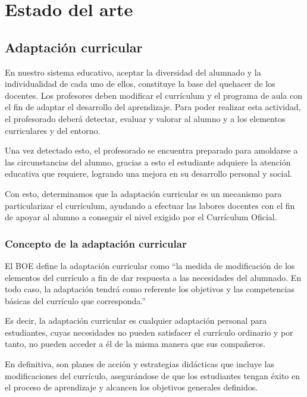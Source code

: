 \chapter{Estado del arte}
\label{cap:estadoDelArte}

\section{Adaptación curricular}
\nocite{adaptacionCurricular}
\nocite{adaptacionCurricular2}
En nuestro sistema educativo, aceptar la diversidad del alumnado y la individualidad de cada uno de ellos, constituye la base del quehacer de los docentes. Los profesores deben modificar el currículum y el programa de aula con el fin de adaptar el desarrollo del aprendizaje. Para poder realizar esta actividad, el profesorado deberá detectar, evaluar y valorar al alumno y a los elementos curriculares y del entorno.

Una vez detectado esto, el profesorado se encuentra preparado para amoldarse a las circunstancias del alumno, gracias a esto el estudiante adquiere la atención educativa que requiere, logrando una mejora en su desarrollo personal y social.

Con esto, determinamos que la adaptación curricular es un mecanismo para particularizar el currículum, ayudando a efectuar las labores docentes con el fin de apoyar al alumno a conseguir el nivel exigido por el Currículum Oficial. \nocite{adaptacionIntro} 

\subsection{Concepto de la adaptación curricular}
El BOE \citep{BOE} define la adaptación curricular como ``la medida de modificación de los elementos del currículo a fin de dar respuesta a las necesidades del alumnado. En todo caso, la adaptación tendrá como referente los objetivos y las competencias básicas del currículo que corresponda.''

Es decir, la adaptación curricular es cualquier adaptación personal para estudiantes, cuyas necesidades no pueden satisfacer el currículo ordinario y por tanto, no pueden acceder a él de la misma manera que sus compañeros.

En definitiva, son planes de acción y estrategias didácticas que incluye las modificaciones del currículo, asegurándose de que los estudiantes tengan éxito en el proceso de aprendizaje y alcancen los objetivos generales definidos.

